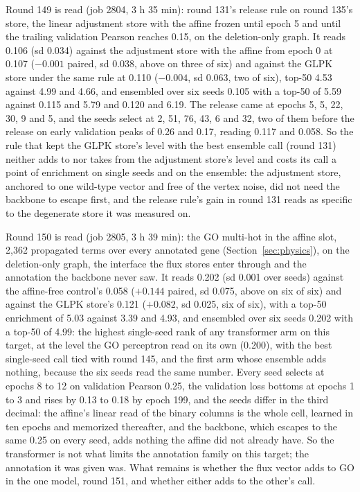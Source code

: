Round 149 is read (job 2804, 3 h 35 min): round 131's release rule on round 135's
store, the linear adjustment store with the affine frozen until epoch 5 and until the
trailing validation Pearson reaches 0.15, on the deletion-only graph. It reads 0.106
(sd 0.034) against the adjustment store with the affine from epoch 0 at 0.107
($-0.001$ paired, sd 0.038, above on three of six) and against the GLPK store under
the same rule at 0.110 ($-0.004$, sd 0.063, two of six), top-50 4.53 against 4.99 and
4.66, and ensembled over six seeds 0.105 with a top-50 of 5.59 against 0.115 and 5.79
and 0.120 and 6.19. The release came at epochs 5, 5, 22, 30, 9 and 5, and the seeds
select at 2, 51, 76, 43, 6 and 32, two of them before the release on early validation
peaks of 0.26 and 0.17, reading 0.117 and 0.058. So the rule that kept the GLPK
store's level with the best ensemble call (round 131) neither adds to nor takes from
the adjustment store's level and costs its call a point of enrichment on single seeds
and on the ensemble: the adjustment store, anchored to one wild-type vector and free of
the vertex noise, did not need the backbone to escape first, and the release rule's
gain in round 131 reads as specific to the degenerate store it was measured on.

Round 150 is read (job 2805, 3 h 39 min): the GO multi-hot in the affine slot, 2,362
propagated terms over every annotated gene (Section~\ref{sec:physics}), on the
deletion-only graph, the interface the flux stores enter through and the annotation
the backbone never saw. It reads 0.202 (sd 0.001 over seeds) against the affine-free
control's 0.058 ($+0.144$ paired, sd 0.075, above on six of six) and against the GLPK
store's 0.121 ($+0.082$, sd 0.025, six of six), with a top-50 enrichment of 5.03
against 3.39 and 4.93, and ensembled over six seeds 0.202 with a top-50 of 4.99: the
highest single-seed rank of any transformer arm on this target, at the level the GO
perceptron read on its own (0.200), with the best single-seed call tied with round 145,
and the first arm whose ensemble adds nothing, because the six seeds read the same
number. Every seed selects at epochs 8 to 12 on validation Pearson 0.25, the validation
loss bottoms at epochs 1 to 3 and rises by 0.13 to 0.18 by epoch 199, and the seeds
differ in the third decimal: the affine's linear read of the binary columns is the
whole cell, learned in ten epochs and memorized thereafter, and the backbone, which
escapes to the same 0.25 on every seed, adds nothing the affine did not already have.
So the transformer is not what limits the annotation family on this target; the
annotation it was given was. What remains is whether the flux vector adds to GO in the
one model, round 151, and whether either adds to the other's call.

